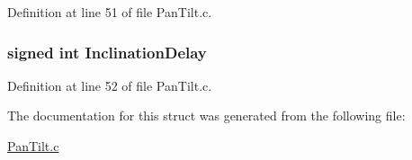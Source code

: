 Definition at line 51 of file Pan\+Tilt.\+c.

\hypertarget{struct_delay_a4f5b10a6a07a4aaed02134ab2691b8ec}{
\subsubsection[{Inclination\+Delay}]{\setlength{\rightskip}{0pt plus 5cm}signed int Inclination\+Delay}}\label{struct_delay_a4f5b10a6a07a4aaed02134ab2691b8ec}


Definition at line 52 of file Pan\+Tilt.\+c.



The documentation for this struct was generated from the following file\+:\begin{DoxyCompactItemize}
\item 
\hyperlink{_pan_tilt_8c}{Pan\+Tilt.\+c}\end{DoxyCompactItemize}
